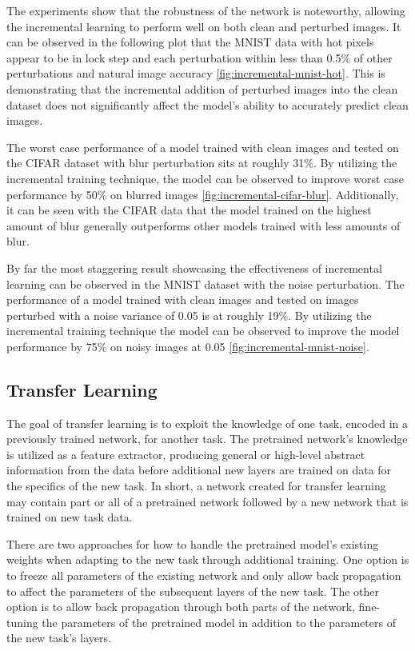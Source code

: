 \documentclass[conference]{IEEEtran}
\begin{document}
The experiments show that the robustness of the network is noteworthy, allowing the incremental learning to perform well on both clean and perturbed images. It can be observed in the following plot that the MNIST data with hot pixels appear to be in lock step and each perturbation within less than 0.5\% of other perturbations and natural image accuracy \autoref{fig:incremental-mnist-hot}. This is demonstrating that the incremental addition of perturbed images into the clean dataset does not significantly affect the model’s ability to accurately predict clean images.

The worst case performance of a model trained with clean images and tested on the CIFAR dataset with blur perturbation sits at roughly 31\%. By utilizing the incremental training technique, the model can be observed to improve worst case performance by 50\% on blurred images \autoref{fig:incremental-cifar-blur}. Additionally, it can be seen with the CIFAR data that the model trained on the highest amount of blur generally outperforms other models trained with less amounts of blur.

By far the most staggering result showcasing the effectiveness of incremental learning can be observed in the MNIST dataset with the noise perturbation. The performance of a model trained with clean images and tested on images perturbed with a noise variance of 0.05 is at roughly 19\%. By utilizing the incremental training technique the model can be observed to improve the model performance by 75\% on noisy images at 0.05 \autoref{fig:incremental-mnist-noise}.

\subsection{Transfer Learning}

The goal of transfer learning is to exploit the knowledge of one task, encoded in a previously trained network, for another task. The pretrained network's knowledge is utilized as a feature extractor, producing general or high-level abstract information from the data before additional new layers are trained on data for the specifics of the new task. In short, a network created for transfer learning may contain part or all of a pretrained network followed by a new network that is trained on new task data.

There are two approaches for how to handle the pretrained model's existing weights when adapting to the new task through additional training. One option is to freeze all parameters of the existing network and only allow back propagation to affect the parameters of the subsequent layers of the new task. The other option is to allow back propagation through both parts of the network, fine-tuning the parameters of the pretrained model in addition to the parameters of the new task’s layers.
\end{document}
